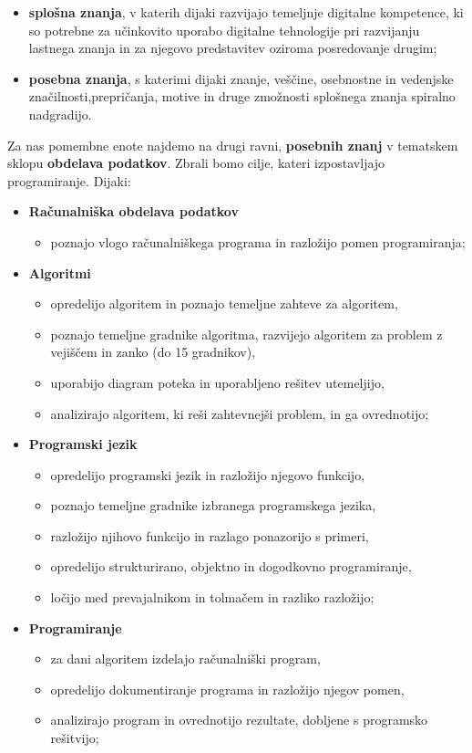 \begin{itemize}
\item \textbf{splošna znanja}, v katerih dijaki razvijajo temeljnje
  digitalne kompetence, ki so potrebne za učinkovito uporabo digitalne
  tehnologije pri razvijanju lastnega znanja in za njegovo
  predstavitev oziroma posredovanje drugim;
\item \textbf{posebna znanja}, s katerimi dijaki znanje, veščine,
  osebnostne in vedenjske značilnosti,prepričanja, motive in druge
  zmožnosti splošnega znanja spiralno nadgradijo.
\end{itemize}

Za nas pomembne enote najdemo na drugi ravni, \textbf{posebnih znanj}
v tematskem sklopu \textbf{obdelava podatkov}. Zbrali bomo cilje,
kateri izpostavljajo programiranje. Dijaki:

\begin{itemize}
\tightlist
\item \textbf{Računalniška obdelava podatkov}
  \begin{itemize}
    \tightlist
  \item poznajo vlogo računalniškega programa in razložijo pomen programiranja;
  \end{itemize}
\item \textbf{Algoritmi}
  \begin{itemize}
    \tightlist
  \item  opredelijo algoritem in poznajo temeljne zahteve za algoritem,
  \item poznajo temeljne gradnike algoritma, razvijejo algoritem za
    problem z vejiščem in zanko (do 15 gradnikov),
  \item uporabijo diagram poteka in uporabljeno rešitev utemeljijo,
  \item analizirajo algoritem, ki reši zahtevnejši problem, in ga
    ovrednotijo;
  \end{itemize}
\item \textbf{Programski jezik}
  \begin{itemize}
    \tightlist
  \item opredelijo programski jezik in razložijo njegovo funkcijo,
  \item poznajo temeljne gradnike izbranega programskega jezika,
  \item razložijo njihovo funkcijo in razlago ponazorijo s primeri,
  \item opredelijo strukturirano, objektno in dogodkovno
    programiranje,
    \item ločijo med prevajalnikom in tolmačem in razliko razložijo;
  \end{itemize}
\item \textbf{Programiranje}
  \begin{itemize}
    \tightlist
  \item za dani algoritem izdelajo računalniški program,
  \item opredelijo dokumentiranje programa in razložijo njegov pomen,
  \item analizirajo program in ovrednotijo rezultate, dobljene s
     programsko rešitvijo;
  \end{itemize}
\end{itemize}


